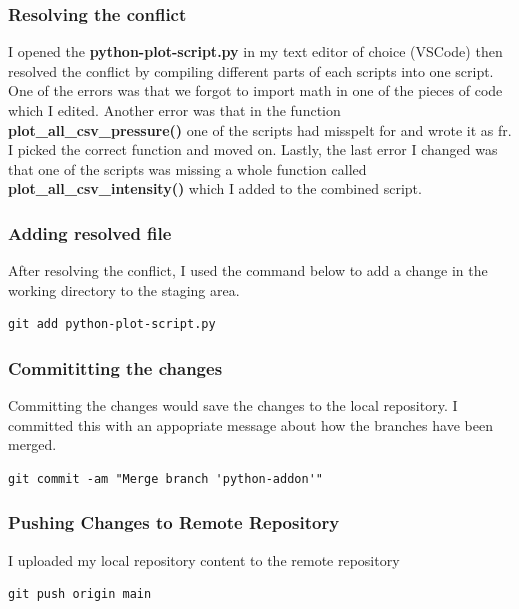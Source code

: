 \documentclass[]{article}
\begin{document}
\subsubsection{Resolving the conflict}
I opened the \textbf{python-plot-script.py} in my text editor of choice (VSCode) then resolved the conflict by compiling different
parts of each scripts into one script. One of the errors was that we forgot to import math in one of the pieces of code
which I edited. Another error was that in the function \textbf{plot\_all\_csv\_pressure()} one of the scripts had misspelt for and
wrote it as fr. I picked the correct function and moved on. Lastly, the last error I changed was that one of the scripts
was missing a whole function called \textbf{plot\_all\_csv\_intensity()} which I added to the combined script.
\subsubsection{Adding resolved file}
After resolving the conflict, I used the command below to add a change in the working directory to the staging area.
\begin{tcolorbox}[colback=white, colframe=black, boxrule=1pt, arc=2mm, 
    fonttitle=\bfseries, listing only, listing options={language=sh, basicstyle=\ttfamily}]
\begin{verbatim}
git add python-plot-script.py
\end{verbatim}
\clearpage
\end{tcolorbox}
\subsubsection{Commititting the changes}
Committing the changes would save the changes to the local repository. I committed this with an appopriate message about how the
branches have been merged.
\begin{tcolorbox}[colback=white, colframe=black, boxrule=1pt, arc=2mm, 
    fonttitle=\bfseries, listing only, listing options={language=sh, basicstyle=\ttfamily}]
\begin{verbatim}
git commit -am "Merge branch 'python-addon'"
\end{verbatim}
\end{tcolorbox}
\subsubsection{Pushing Changes to Remote Repository}
I uploaded my local repository content to the remote repository 
\begin{tcolorbox}[colback=white, colframe=black, boxrule=1pt, arc=2mm, 
    fonttitle=\bfseries, listing only, listing options={language=sh, basicstyle=\ttfamily}]
\begin{verbatim}
git push origin main
\end{verbatim}
\end{tcolorbox}
\end{document}
